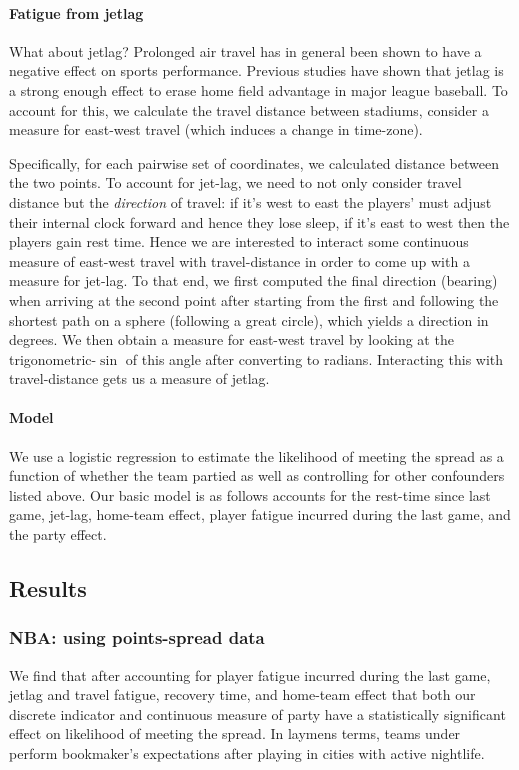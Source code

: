 \documentclass[letterpaper,12pt]{article}
\begin{document}
\paragraph{Fatigue from jetlag}
What about jetlag? Prolonged air travel has in general been shown
to have a negative effect on sports performance.\citep{leeandgalvez}
Previous studies have shown that jetlag is a strong enough effect
to erase home field advantage in major league baseball.\citep{songetal}
To account for this, we calculate the travel distance between stadiums,
consider a measure for east-west travel (which induces a change in time-zone).

Specifically, for each pairwise set of coordinates, we calculated distance between the two
points.\citep{sp} To account for jet-lag, we need to not only consider travel distance
but the \emph{direction} of travel: if it's west to east the players' must adjust their internal
clock forward and hence they lose sleep, if it's east to west then the players gain rest time.
Hence we are interested to interact some continuous measure of east-west travel with
travel-distance in order to come up with a measure for jet-lag.
To that end, we first computed the final direction 
(bearing) when arriving at the 
second point after starting from the first and following the shortest path on a sphere 
(following a great circle), which yields a direction in degrees. 
We then obtain a measure for east-west travel by looking at the trigonometric-$\sin$ of this angle after converting to radians.
Interacting this with travel-distance gets us a measure of jetlag.\citep{lallensack}


\paragraph{Model} We use a logistic regression to estimate the likelihood of meeting
the spread as a function of whether the team partied as well as controlling for other confounders
listed above. Our basic model is as follows accounts for the rest-time since
last game, jet-lag, home-team effect, player fatigue incurred during the last game,
and the party effect.

\subsection{Results}
\subsubsection{NBA: using points-spread data}
We find that after accounting for player fatigue incurred during the last game, jetlag and travel fatigue, recovery time, and home-team effect that both our discrete indicator and continuous measure of party
have a statistically significant effect on likelihood of meeting the spread.
In laymens terms, teams under perform bookmaker's expectations after playing in cities 
with active nightlife.
\end{document}
